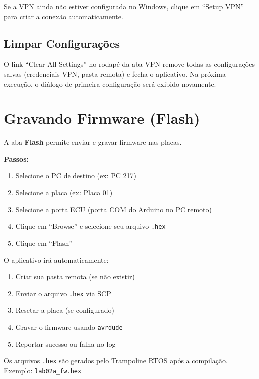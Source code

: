 \documentclass[12pt,a4paper]{article}
\begin{document}
\begin{notabox}
Se a VPN ainda não estiver configurada no Windows, clique em ``Setup VPN'' para criar a conexão automaticamente.
\end{notabox}

\subsection{Limpar Configurações}

O link ``Clear All Settings'' no rodapé da aba VPN remove todas as configurações salvas (credenciais VPN, pasta remota) e fecha o aplicativo. Na próxima execução, o diálogo de primeira configuração será exibido novamente.

\section{Gravando Firmware (Flash)}

A aba \textbf{Flash} permite enviar e gravar firmware nas placas.

\textbf{Passos:}
\begin{enumerate}[nosep]
  \item Selecione o PC de destino (ex: PC 217)
  \item Selecione a placa (ex: Placa 01)
  \item Selecione a porta ECU (porta COM do Arduino no PC remoto)
  \item Clique em ``Browse'' e selecione seu arquivo \texttt{.hex}
  \item Clique em ``Flash''
\end{enumerate}

O aplicativo irá automaticamente:
\begin{enumerate}[nosep, label=\alph*)]
  \item Criar sua pasta remota (se não existir)
  \item Enviar o arquivo \texttt{.hex} via SCP
  \item Resetar a placa (se configurado)
  \item Gravar o firmware usando \texttt{avrdude}
  \item Reportar sucesso ou falha no log
\end{enumerate}

\begin{notabox}
Os arquivos \texttt{.hex} são gerados pelo Trampoline RTOS após a compilação. Exemplo: \texttt{lab02a\_fw.hex}
\end{notabox}
\end{document}
